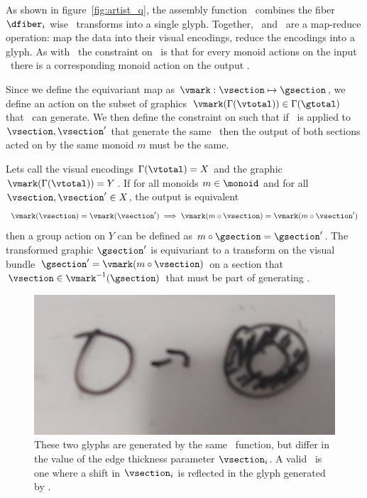 \documentclass[../main.tex]{subfiles}
\begin{document}
As shown in figure~\ref{fig:artist_q}, the assembly function \vmark\ combines the fiber $\dfiber_i$ wise \vchannel\ transforms into a single glyph. Together, \vchannel\ and \vmark\ are a map-reduce operation: map the data into their visual encodings, reduce the encodings into a glyph. As with \vchannel\, the constraint on \vmark\ is that for every monoid actions on the input \vsection\ there is a corresponding monoid action on the output \gsection. 

Since we define the equivariant map as  $\vmark: \vsection \mapsto \gsection$, we define an action on the subset of graphics $\vmark(\Gamma(\vtotal)) \in \Gamma(\gtotal)$ that \vmark\ can generate. We then define the constraint on \vmark such that if \vmark\ is applied to $\vsection, \vsection^{\prime}$ that generate the same \gsection\, then the output of both sections acted on by the same monoid $m$ must be the same.   

Lets call the visual encodings $\Gamma(\vtotal)=X$ and the graphic $\vmark(\Gamma(\vtotal))=Y$. If for all monoids $m \in \monoid$ and for all $\vsection, \vsection^{\prime} \in X$, the output is equivalent 
\begin{equation}
\vmark(\vsection) = \vmark(\vsection^{\prime})\implies \vmark(m\circ\vsection) = \vmark(m\circ\vsection^{\prime})
\end{equation}
then a group action on $Y$ can be defined as $m\circ \gsection = \gsection^{\prime}$. The transformed graphic $\gsection^{\prime}$ is equivariant to a transform on the visual bundle $\gsection^{\prime}=\vmark(m\circ \vsection)$ on a section that $\vsection \in \vmark^{-1}(\gsection)$ that must be part of generating \gsection. 



\begin{figure}[H]
    \includegraphics[width=\textwidth]{figures/math/diff_type_q.png}
    \caption{These two glyphs are generated by the same \vmark\ function, but differ in the value of the edge thickness parameter $\vsection_i$. A valid \vmark\ is one where a shift in $\vsection_i$ is reflected in the glyph generated by \gsection.}
    \label{fig:artist_mark_change}
\end{figure}
\end{document}
